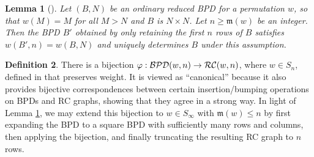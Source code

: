 \documentclass{amsart}
\newtheorem{lemma}{Lemma}[subsection]
\theoremstyle{definition}
\newtheorem{definition}[lemma]{Definition}
\theoremstyle{remark}
\numberwithin{equation}{subsection}
\newcommand{\maxd}{\mathfrak{m}}
\begin{document}
\begin{lemma}[{\cite[Theorem~3.6]{Yu2025EmbeddingBP}}] \label{lemma:bpd_completion}
  Let $(B, N)$ be an ordinary reduced BPD for a permutation $w$, so that $w(M) = M$ for all $M>N$ and $B$ is $N\times N$. Let $n\geq \maxd(w)$ be an integer. Then the BPD $B'$ obtained by only retaining the first $n$ rows of $B$ satisfies $w(B', n) = w(B, N)$ and uniquely determines $B$ under this assumption.
\end{lemma}


\begin{definition}
There is a bijection $\varphi:\mathcal{BPD}(w,n)\to \mathcal{RC}(w,n)$, where $w\in S_n$, defined in \cite{GaoHuang2023} that preserves weight. It is viewed as ``canonical'' because it also provides bijective correspondences between certain insertion/bumping operations on BPDs and RC graphs, showing that they agree in a strong way. In light of Lemma \ref{lemma:bpd_completion}, we may extend this bijection to $w\in S_\infty$ with $\maxd(w)\leq n$ by first expanding the BPD to a square BPD with sufficiently many rows and columns, then applying the bijection, and finally truncating the resulting RC graph to $n$ rows.
\end{definition}
\end{document}
